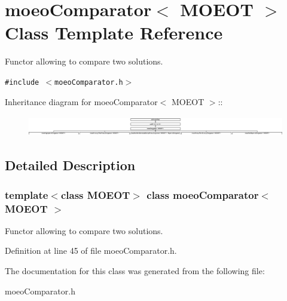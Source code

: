\section{moeo\-Comparator$<$ MOEOT $>$ Class Template Reference}
\label{classmoeoComparator}
Functor allowing to compare two solutions.  


{\tt \#include $<$moeo\-Comparator.h$>$}

Inheritance diagram for moeo\-Comparator$<$ MOEOT $>$::\begin{figure}[H]
\begin{center}
\leavevmode
\includegraphics[height=0.903226cm]{classmoeoComparator}
\end{center}
\end{figure}


\subsection{Detailed Description}
\subsubsection*{template$<$class MOEOT$>$ class moeo\-Comparator$<$ MOEOT $>$}

Functor allowing to compare two solutions. 



Definition at line 45 of file moeo\-Comparator.h.

The documentation for this class was generated from the following file:\begin{CompactItemize}
\item 
moeo\-Comparator.h\end{CompactItemize}
